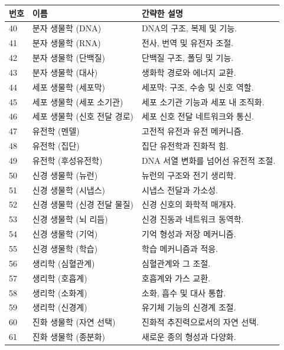 \documentclass[13pt,a4paper]{article}
\begin{document}
	\begin{longtable}{|p{0.9cm}|p{6.0cm}|p{8.6cm}|}
		\hline
		\textbf{번호} & \textbf{이름} & \textbf{간략한 설명} \\
		\hline
		\endhead
		40 & 분자 생물학 (DNA) & DNA의 구조, 복제 및 기능. \\
		\hline
		41 & 분자 생물학 (RNA) & 전사, 번역 및 유전자 조절. \\
		\hline
		42 & 분자 생물학 (단백질) & 단백질 구조, 폴딩 및 기능. \\
		\hline
		43 & 분자 생물학 (대사) & 생화학 경로와 에너지 교환. \\
		\hline
		44 & 세포 생물학 (세포막) & 세포막: 구조, 수송 및 신호 역할. \\
		\hline
		45 & 세포 생물학 (세포 소기관) & 세포 소기관 기능과 세포 내 조직화. \\
		\hline
		46 & 세포 생물학 (신호 전달 경로) & 세포 신호 전달 네트워크와 통신. \\
		\hline
		47 & 유전학 (멘델) & 고전적 유전과 유전 메커니즘. \\
		\hline
		48 & 유전학 (집단) & 집단 유전학과 진화적 힘. \\
		\hline
		49 & 유전학 (후성유전학) & DNA 서열 변화를 넘어선 유전적 조절. \\
		\hline
		50 & 신경 생물학 (뉴런) & 뉴런의 구조와 전기 생리학. \\
		\hline
		51 & 신경 생물학 (시냅스) & 시냅스 전달과 가소성. \\
		\hline
		52 & 신경 생물학 (신경 전달 물질) & 신경 신호의 화학적 매개자. \\
		\hline
		53 & 신경 생물학 (뇌 리듬) & 신경 진동과 네트워크 동역학. \\
		\hline
		54 & 신경 생물학 (기억) & 기억 형성과 저장 메커니즘. \\
		\hline
		55 & 신경 생물학 (학습) & 학습 메커니즘과 적응. \\
		\hline
		56 & 생리학 (심혈관계) & 심혈관계와 그 조절. \\
		\hline
		57 & 생리학 (호흡계) & 호흡계와 가스 교환. \\
		\hline
		58 & 생리학 (소화계) & 소화, 흡수 및 대사 통합. \\
		\hline
		59 & 생리학 (신경계) & 유기체 기능의 신경계 조절. \\
		\hline
		60 & 진화 생물학 (자연 선택) & 진화적 추진력으로서의 자연 선택. \\
		\hline
		61 & 진화 생물학 (종분화) & 새로운 종의 형성과 다양화. \\
		\hline

\end{longtable}
\end{document}
